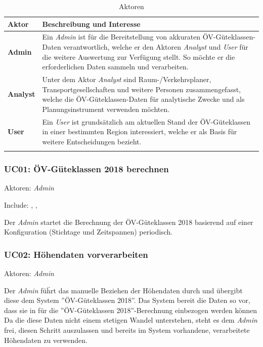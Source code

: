 \begin{longtable}{l p{14cm}}
        \toprule
        \textbf{Aktor}
                                & \textbf{Beschreibung und Interesse} \\
        \midrule
        \textbf{Admin}
                                & Ein \emph{Admin} ist für die Bereitstellung von akkuraten \acs{ÖV}-Güteklassen-Daten verantwortlich, welche er den Aktoren \emph{Analyst} und \emph{User} für die weitere Auswertung zur Verfügung stellt.
                                So möchte er die erforderlichen Daten sammeln und verarbeiten. \\
        \textbf{Analyst}
                                & Unter dem Aktor \emph{Analyst} sind Raum-/Verkehrsplaner, Transportgesellschaften und weitere Personen zusammengefasst, welche die \acs{ÖV}-Güteklassen-Daten für analytische Zwecke und als Planungsinstrument verwenden möchten. \\
        \textbf{User}
                                & Ein \emph{User} ist grundsätzlich am aktuellen Stand der \acs{ÖV}-Güteklassen in einer bestimmten Region interessiert, welche er als Basis für weitere Entscheidungen bezieht. \\
        \bottomrule
    \caption{Aktoren}
    \label{table:Aktoren}
\end{longtable}

\subsubsection{UC01: ÖV-Güteklassen 2018 berechnen}
\label{Use Cases:UC01}

Aktoren: \emph{Admin}

Include: , , 

Der \emph{Admin} startet die Berechnung der \acs{ÖV}-Güteklassen 2018 basierend auf einer Konfiguration (Stichtage und Zeitspannen) periodisch.


\subsubsection{UC02: Höhendaten vorverarbeiten}
\label{Use Cases:UC02}

Aktoren: \emph{Admin}

Der \emph{Admin} füḧrt das manuelle Beziehen der Höhendaten durch und übergibt diese dem System ''\acs{ÖV}-Güteklassen 2018''.
Das System bereit die Daten so vor, dass sie in  für die ''\acs{ÖV}-Güteklassen 2018''-Berechnung einbezogen werden können
Da die diese Daten nicht einem stetigen Wandel unterstehen, steht es dem \emph{Admin} frei, diesen Schritt auszulassen und bereits im System vorhandene, verarbeitete Höhendaten zu verwenden.

